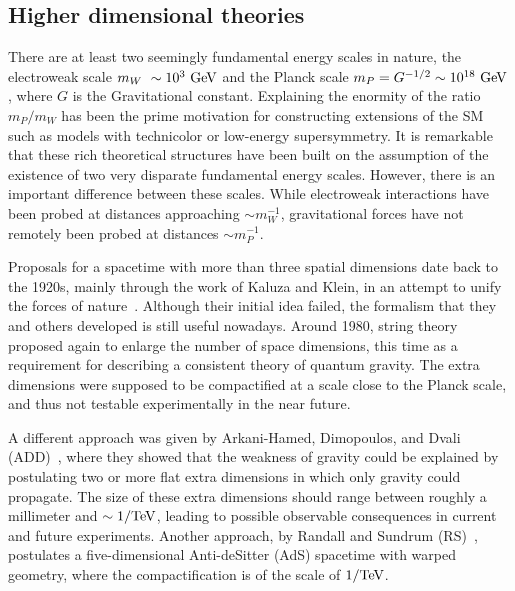 \subsection{Higher dimensional theories}

There are at least two seemingly fundamental energy scales in nature, the electroweak scale \(m_{W}~\sim 10^3~\text{GeV}\) and the Planck scale \(m_P = G^{-1/2} \sim 10^{18}~\text{GeV}\), where \(G\) is the Gravitational constant. Explaining the enormity of the ratio \(m_P / m_W\) has been the prime motivation for constructing extensions of the \ac{SM} such as models with technicolor or low-energy supersymmetry. It is remarkable that these rich theoretical structures have been built on the assumption of the existence of two very disparate fundamental energy scales. However, there is an important difference between these scales. While electroweak interactions have been probed at distances approaching \(\sim m_W^{-1}\), gravitational forces have not remotely been probed at distances \(\sim m_P^{-1}\).

Proposals for a spacetime with more than three spatial dimensions date back to the 1920s, mainly through the work of Kaluza and Klein, in an attempt to unify the forces of nature~\cite{Bailin_Love-1987}. Although their initial idea failed, the formalism that they and others developed is still useful nowadays. Around 1980, string theory proposed again to enlarge the number of space dimensions, this time as a requirement for describing a consistent theory of quantum gravity. The extra dimensions were supposed to be compactified at a scale close to the Planck scale, and thus not testable experimentally in the near future.

A different approach was given by Arkani-Hamed, Dimopoulos, and Dvali (ADD)~\cite{ADD-1998}, where they showed that the weakness of gravity could be explained by postulating two or more flat extra dimensions in which only gravity could propagate. The size of these extra dimensions should range between roughly a millimeter and \(\sim 1/\text{TeV}\), leading to possible observable consequences in current and future experiments. Another approach, by Randall and Sundrum (RS)~\cite{RS1-1999_1,RS1-1999_2}, postulates a five-dimensional Anti-deSitter (AdS) spacetime with warped geometry, where the compactification is of the scale of \(1/\text{TeV}\).


